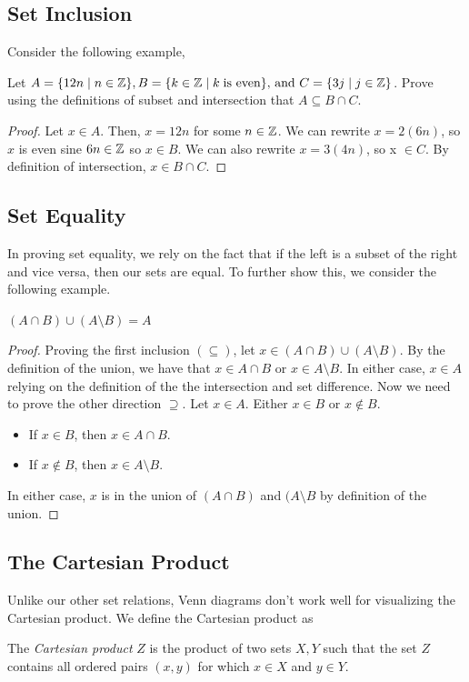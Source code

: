 \subsection{Set Inclusion}
Consider the following example,
\begin{example}
Let $A = \{12n \mid n \in \mathbb{Z}\}, B = \{k \in \mathbb{Z} \mid k \; \text{is even}\}\text{, and } C = \{3j \mid j \in \mathbb{Z}\}$. Prove using the definitions of subset and intersection that $A \subseteq B \cap C$. 
\begin{proof}
Let $x \in A$. Then, $x = 12n$ for some $n\in \mathbb{Z}$. We can rewrite $x = 2(6n)$, so $x$ is even sine $6n \in \mathbb{Z}$ so $x\in B$. We can also rewrite $x = 3(4n)$, so x $\in C$. By definition of intersection, $x \in B \cap C$.
\end{proof}
\end{example}
\subsection{Set Equality}
In proving set equality, we rely on the fact that if the left is a subset of the right and vice versa, then our sets are equal. To further show this, we consider the following example.
\begin{example}
$(A \cap B) \cup (A \setminus B) = A$
\begin{proof}
Proving the first inclusion $(\subseteq)$, let $x \in (A \cap B) \cup (A \setminus B)$. By the definition of the union, we have that $x \in A \cap B$ or $x \in A \setminus B$. In either case, $x \in A$ relying on the definition of the the intersection and set difference. 
\smallbreak
Now we need to prove the other direction $\supseteq$. Let $x \in A$. Either $x \in B$ or $x \not \in B$.
\begin{itemize}
    \item If $x \in B$, then $x \in A \cap B$. 
    \item If $x \not\in B$, then $x \in A \setminus B$.
\end{itemize}
In either case, $x$ is in the union of $(A \cap B)$ and $(A \setminus B$ by definition of the union.
\end{proof}
\end{example}
\subsection{The Cartesian Product}
Unlike our other set relations, Venn diagrams don't work well for visualizing the Cartesian product. We define the Cartesian product as
\begin{definition}
The \emph{Cartesian product} $Z$ is the product of two sets $X, Y$ such that the set $Z$ contains all ordered pairs $(x, y)$ for which $x \in X$ and $y \in Y$. 
\end{definition}
